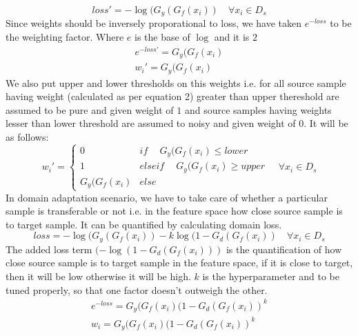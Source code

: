 \begin{equation*}
    loss' = -\log(G_y(G_f(x_i)) \quad \forall x_i \in D_s
\end{equation*}
Since weights should be inversely proporational to loss, we have taken $e^{-loss}$ to be the weighting factor. Where $e$ is the base of $\log$ and it is $2$
\begin{equation*}
\begin{align}
    e^{-loss'} = G_y(G_f(x_i)\\
    w_{i}' =     G_y(G_f(x_i)
\end{align}
\end{equation*}
We also put upper and lower thresholds on this weights i.e. for all source sample having weight (calculated as per equation 2) greater than upper thereshold are assumed to be pure and given weight of $1$ and source samples having weights lesser than lower threshold are assumed to noisy and given weight of $0$. It will be as follows:
\begin{equation*}
                w_{i}' = \begin{cases}
		            0 & if\ \quad G_y(G_f(x_i) \le lower \\
		            1 & elseif\ \quad G_y(G_f(x_i) \ge upper \\
		            G_y(G_f(x_i) & else\ 
		            \end{cases} \quad \forall x_i \in D_s
\end{equation*}
In domain adaptation scenario, we have to take care of whether a particular sample is transferable or not i.e. in the feature space how close source sample is to target sample. It can be quantified by calculating domain loss.
\begin{equation}
    loss = -\log(G_y(G_f(x_i)) - k \log(1 - G_d(G_f(x_i)) \quad \forall x_i \in D_s
\end{equation}
The added loss term $(-\log(1 - G_d(G_f(x_i)))$ is the quantification of how close source sample is to target sample in the feature space, if it is close to target, then it will be low otherwise it will be high. $k$ is the hyperparameter and to be tuned properly, so that one factor doesn't outweigh the other.
\begin{equation}
\begin{align}
    e^{-loss} = G_y(G_f(x_i)(1 - G_d(G_f(x_i))^k\\
    w_{i} =     G_y(G_f(x_i)(1 - G_d(G_f(x_i))^k
\end{align}
\end{equation}

